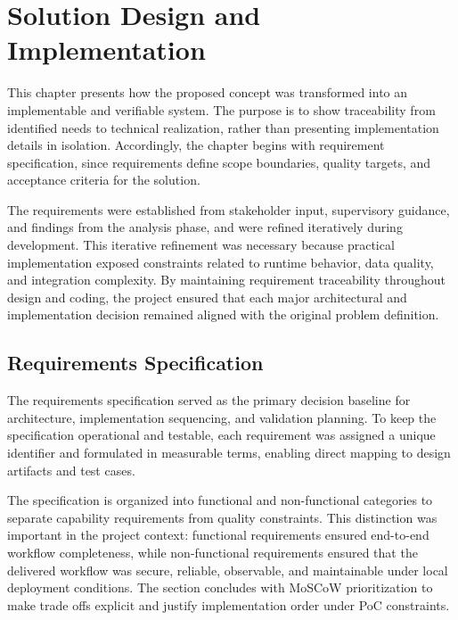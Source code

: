 \chapter{Solution Design and Implementation}

This chapter presents how the proposed concept was transformed into an implementable and verifiable system.
The purpose is to show traceability from identified needs to technical realization, rather than presenting implementation details in isolation.
Accordingly, the chapter begins with requirement specification, since requirements define scope boundaries, quality targets, and acceptance criteria for the solution.

\vspace{0.4cm}

The requirements were established from stakeholder input, supervisory guidance, and findings from the analysis phase, and were refined iteratively during development.
This iterative refinement was necessary because practical implementation exposed constraints related to runtime behavior, data quality, and integration complexity.
By maintaining requirement traceability throughout design and coding, the project ensured that each major architectural and implementation decision remained aligned with the original problem definition. 

\section{Requirements Specification}

The requirements specification served as the primary decision baseline for architecture, implementation sequencing, and validation planning.
To keep the specification operational and testable, each requirement was assigned a unique identifier and formulated in measurable terms, enabling direct mapping to design artifacts and test cases.

\vspace{0.4cm}

The specification is organized into functional and non-functional categories to separate capability requirements from quality constraints.
This distinction was important in the project context: functional requirements ensured end-to-end workflow completeness, while non-functional requirements ensured that the delivered workflow was secure, reliable, observable, and maintainable under local deployment conditions.
The section concludes with MoSCoW prioritization to make trade offs explicit and justify implementation order under PoC constraints. 

